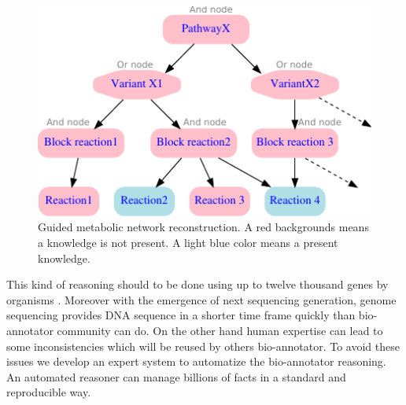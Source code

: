 \documentclass{llncs}
\begin{document}
\begin{figure}[H]
    \centering
    \includegraphics{img/pathway.pdf}
    \caption{Guided metabolic network reconstruction. A red backgrounds means a knowledge is not present. A light blue color means a present knowledge. }
    \label{fig:metabolicNetworkReconstruction}
\end{figure}

This kind of reasoning should to be done using up to twelve thousand genes by organisms \cite{dagan2013genomes}. Moreover with the emergence of next sequencing generation, genome sequencing provides DNA sequence in a shorter time frame quickly than bio-annotator community can do. On the other hand human expertise can lead to some inconsistencies which will be reused by others bio-annotator. To avoid these issues we develop an expert system to automatize the bio-annotator reasoning. An automated reasoner can manage billions of facts in a standard and reproducible way.
\end{document}

